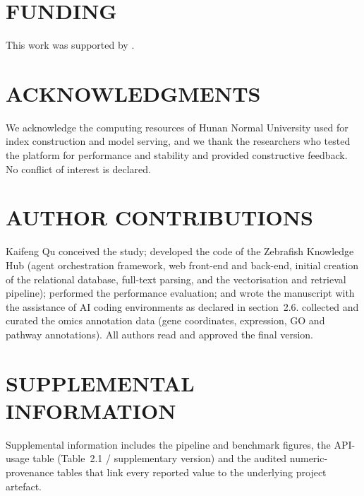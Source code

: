 
\section*{FUNDING}

This work was supported by .


\section*{ACKNOWLEDGMENTS}

We acknowledge the computing resources of Hunan Normal University used for index
construction and model serving, and we thank the researchers who tested the
platform for performance and stability and provided constructive feedback. No
conflict of interest is declared.

\section*{AUTHOR CONTRIBUTIONS}

Kaifeng Qu conceived the study; developed the code of the Zebrafish Knowledge Hub
(agent orchestration framework, web front-end and back-end, initial creation of the
relational database, full-text parsing, and the vectorisation and retrieval
pipeline); performed the performance evaluation; and wrote the manuscript with the
assistance of AI coding environments as declared in section~2.6. 
collected and curated the omics annotation data (gene coordinates, expression, GO
and pathway annotations). All authors read and approved the final version.

\section*{SUPPLEMENTAL INFORMATION}

Supplemental information includes the pipeline and benchmark figures, the API-usage
table (Table~2.1 / supplementary version) and the audited numeric-provenance tables
that link every reported value to the underlying project artefact.

% 
